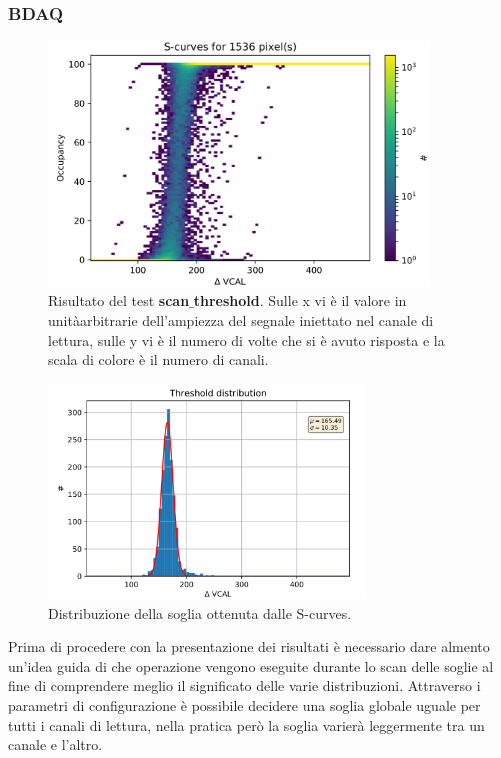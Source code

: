 \subsubsection{BDAQ}
\begin{figure}
\centering
\includegraphics[width=0.9\textwidth]{Immagini/Scurves}
\caption{Risultato del test \textbf{scan$\_$threshold}. Sulle x vi è il valore in unitàarbitrarie dell'ampiezza del segnale iniettato nel canale di lettura, sulle y vi è il numero di volte che si è avuto risposta e la scala di colore è il numero di canali.}
\label{Scurves}
\end{figure}
\begin{figure}
\centering
\includegraphics[width=0.75\textwidth]{Immagini/Threshold}
\caption{Distribuzione della soglia ottenuta dalle S-curves.}
\label{Threshold}
\end{figure}
Prima di procedere con la presentazione dei risultati è necessario dare almento un'idea guida di che operazione vengono eseguite durante lo scan delle soglie al fine di comprendere meglio il significato delle varie distribuzioni.
Attraverso i parametri di configurazione è possibile decidere una soglia globale uguale per tutti i canali di lettura, nella pratica però la soglia varierà leggermente tra un canale e l'altro. 
